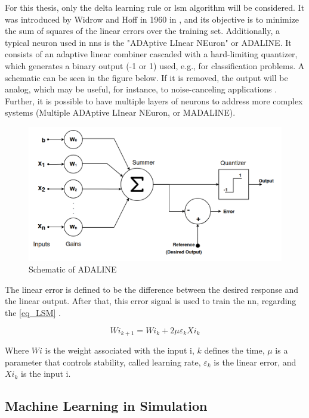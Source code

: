 For this thesis, only the delta learning rule or \gls{lsm} algorithm will be considered. It was introduced by Widrow and Hoff in 1960 in 
\cite{widrow1960adaptive}, and its objective is to minimize the sum of squares of the linear errors over the training set. Additionally, 
a typical neuron used in \glspl{nn} is the "ADAptive LInear NEuron" or ADALINE. It consists of an adaptive linear combiner cascaded with a 
hard-limiting quantizer, which generates a binary output (-1 or 1) used, e.g., for classification problems. A schematic can be seen in the 
figure below. If it is removed, the output will be analog, which may be useful, for instance, to noise-canceling applications 
\cite{widrow1985adaptive}. Further, it is possible to have multiple layers of neurons to address more complex systems (Multiple ADAptive 
LInear NEuron, or MADALINE).

\begin{figure}[H]
	\centering
 	\includegraphics[width=0.8\linewidth]{Images/AdalineSquematic.png}
 	\caption{Schematic of ADALINE \cite{widrow1960adaptive}}
	 \label{fig_AdalineSquematic}
\end{figure}

The linear error is defined to be the difference between the desired response and the linear output. After that, this error signal is used 
to train the \gls{nn}, regarding the \autoref{eq_LSM} \cite{widrow1995perceptrons}.

\begin{equation}
    Wi_{k+1} = Wi_{k} + 2 \mu \varepsilon_{k}Xi_{k}
    \label{eq_LSM}
\end{equation}

Where $Wi$ is the weight associated with the input i, $k$ defines the time, $\mu$ is a parameter that controls stability, called learning 
rate, $\varepsilon_{k}$ is the linear error, and $Xi_{k}$ is the input i. 

\subsection{Machine Learning in Simulation}


